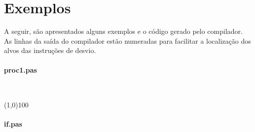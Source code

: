 \section{Exemplos}
A seguir, são apresentados alguns exemplos e o código gerado pelo compilador.
As linhas da saída do compilador estão numeradas para facilitar a localização
dos alvos das instruções de desvio.
\begin{multicols}{2}
\paragraph{proc1.pas}~
\scriptsize


\normalsize

\line(1,0){100}
\paragraph{if.pas}~
\scriptsize


\normalsize


\end{multicols}
